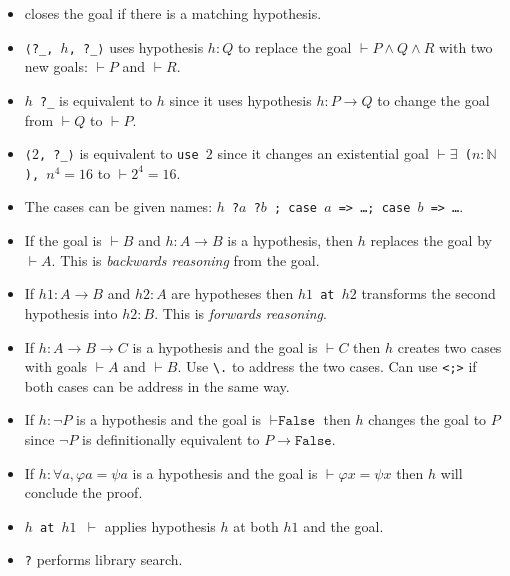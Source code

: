\documentclass[a4paper]{article}
\newcommand{\False}{\texttt{False}}
\newcommand{\N}{\mathbb{N}}
\begin{document}

\begin{itemize}
    \item \assumption closes the goal if there is a matching hypothesis.
\end{itemize}


\begin{itemize}
    \item \texttt{ ⟨?\_, $h$, ?\_⟩} uses hypothesis $h : Q$ to replace the goal $\vdash P \wedge Q \wedge R$ with two new goals: $\vdash P$ and $\vdash R$.
    \item \texttt{ $h$ ?\_} is equivalent to \texttt{\apply $h$} since it uses hypothesis \texttt{$h : P \to Q$} to change the goal from $\vdash Q$ to $\vdash P$.
    \item \texttt{ ⟨$2$, ?\_⟩} is equivalent to \texttt{use $2$} since it changes an existential goal \texttt{$\vdash \exists$ ($n : \N$), $n^4 = 16$} to \texttt{$\vdash 2^4 = 16$}.
    \item The cases can be given names:
    \texttt{ $h$ ?$a$ ?$b$ ; case $a$ => \dots ; case $b$ => \dots}.
\end{itemize}



\begin{itemize}
    \item If the goal is $\vdash B$ and $h: A \to B$ is a hypothesis, then \texttt{\apply $h$} replaces the goal by $\vdash A$. This is \emph{backwards reasoning} from the goal.
    \item If $h1: A \to B$ and $h2:A$ are hypotheses then \texttt{\apply $h1$ at $h2$} transforms the second hypothesis into $h2:B$. This is \emph{forwards reasoning}.
    \item If $h: A \to B \to C$ is a hypothesis and the goal is $\vdash C$ then \texttt{\apply $h$} creates two cases with goals $\vdash A$ and $\vdash B$. Use \verb|\.| to address the two cases. Can use \texttt{<;>} if both cases can be address in the same way.
    \item If $h: \neg P$ is a hypothesis and the goal is $\vdash \False$ then \texttt{\apply $h$} changes the goal to $P$ since $\neg P$ is definitionally equivalent to $P \to \False$.
    \item If $h : \forall a, \varphi a = \psi a$ is a hypothesis and the goal is $\vdash \varphi x = \psi x$ then \texttt{\apply $h$} will conclude the proof.
    \item \texttt{\apply $h$ at $h1$ $\vdash$} applies hypothesis $h$ at both $h1$ and the goal.
    \item \texttt{\apply?} performs library search.
\end{itemize}
\end{document}
